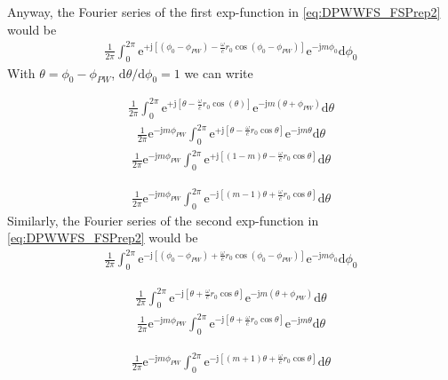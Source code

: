\documentclass[a4paper,BCOR=15mm,10pt,twoside]{scrartcl}
\newcommand\e{\mathrm{e}}  %
\newcommand\im{\mathrm{j}}  %
\newcommand\fsd{\mathrm{d}}  %
\newcommand{\ExCalcCol}[2][CalcColor]{\textcolor{#1}{#2}} %
\begin{document}
Anyway, the Fourier series of the first exp-function in \eqref{eq:DPWWFS_FSPrep2} would be
\begin{align}
\frac{1}{2\pi}\int_0^{2\pi}
\mathrm{e}^{+\mathrm{j}[(\phi_0-\phi_{PW})-\frac{\omega}{c} r_0
\cos(\phi_0-\phi_{PW})]}
\e^{- \im m \phi_0 } \fsd \phi_0
\end{align}
With $\theta=\phi_0-\phi_{PW}$, $\fsd \theta / \fsd \phi_0 = 1$ we can write
\begin{calc}
\ExCalcCol{
\begin{align}
\frac{1}{2\pi}\int_0^{2\pi}
\mathrm{e}^{+\mathrm{j}[\theta-\frac{\omega}{c} r_0
\cos(\theta)]}
\e^{- \im m (\theta+\phi_{PW})} \fsd \theta
\end{align}
\begin{align}
\frac{1}{2\pi} \e^{- \im m \phi_{PW}} 
\int_0^{2\pi}
\mathrm{e}^{+\mathrm{j}[\theta-\frac{\omega}{c} r_0
\cos\theta]}
\e^{- \im m \theta} \fsd \theta
\end{align}
\begin{align}
\frac{1}{2\pi}
\e^{- \im m \phi_{PW}} 
\int_0^{2\pi}
\mathrm{e}^{+\mathrm{j}[(1-m)\theta-\frac{\omega}{c} r_0
\cos\theta]}
\fsd \theta
\end{align}
}
\end{calc}
\begin{align}
\frac{1}{2\pi}
\e^{- \im m \phi_{PW}} 
\int_0^{2\pi}
\mathrm{e}^{-\mathrm{j}[(m-1)\theta+\frac{\omega}{c} r_0
\cos\theta]}
\fsd \theta
\end{align}
Similarly, the Fourier series of the second exp-function in \eqref{eq:DPWWFS_FSPrep2} would be
\begin{align}
\frac{1}{2\pi}
\int_0^{2\pi}
\mathrm{e}^{-\mathrm{j}[(\phi_0-\phi_{PW})+\frac{\omega}{c} r_0
\cos(\phi_0-\phi_{PW})]}
\e^{- \im m \phi_0 } \fsd \phi_0
\end{align}
\begin{calc}
\ExCalcCol{
\begin{align}
\frac{1}{2\pi}
\int_0^{2\pi}
\mathrm{e}^{-\mathrm{j}[\theta+\frac{\omega}{c} r_0
\cos\theta]}
\e^{- \im m (\theta+\phi_{PW})} \fsd \theta
\end{align}
\begin{align}
\frac{1}{2\pi}
\e^{- \im m \phi_{PW}}
\int_0^{2\pi}
\mathrm{e}^{-\mathrm{j}[\theta+\frac{\omega}{c} r_0
\cos\theta]}
\e^{- \im m \theta} \fsd \theta
\end{align}
}
\end{calc}
\begin{align}
\frac{1}{2\pi}
\e^{- \im m \phi_{PW}}
\int_0^{2\pi}
\mathrm{e}^{-\mathrm{j}[(m+1)\theta+\frac{\omega}{c} r_0
\cos\theta]}
\fsd \theta
\end{align}
\end{document}
